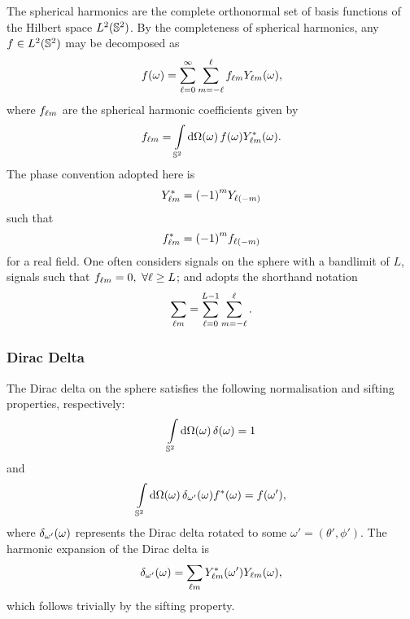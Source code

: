 The spherical harmonics are the complete orthonormal set of basis functions of the Hilbert space \(\hilbert{\twoSphere}\).
By the completeness of spherical harmonics, any \(f \in \hilbert{\twoSphere}\) may be decomposed as
%
\begin{equation}
	\pixel{f}
	= \sum\limits_{\ell=0}^{\infty} \sum\limits_{m=-\ell}^{\ell} \harmonic{f} \pixel{\harmonic{Y}},
\end{equation}
%
where \(\harmonic{f}\) are the spherical harmonic coefficients given by
%
\begin{equation}
	\harmonic{f}
	= \integrateSphere{\omega} \pixel{f} \pixel{\conj{\harmonic{Y}}}.
\end{equation}
%
The phase convention adopted here is
%
\begin{equation}
	\conj{\harmonic{Y}}
	= {(-1)}^{m} Y_{\ell(-m)}
\end{equation}
%
such that
%
\begin{equation}
	\conj{\harmonic{f}}
	= {(-1)}^{m} f_{\ell(-m)}
\end{equation}
%
for a real field.
One often considers signals on the sphere with a bandlimit of \(L\), \ie{} signals such that \(\harmonic{f} = 0,\ \forall \ell \geq L\); and adopts the shorthand notation
%
\begin{equation}
	\harmonicSum
	= \sum\limits_{\ell=0}^{L-1} \sum\limits_{m=-\ell}^{\ell}.
\end{equation}

\subsubsection{Dirac Delta}

The Dirac delta on the sphere satisfies the following normalisation and sifting properties, respectively:
%
\begin{equation}
	\integrateSphere{\omega} \pixel{\delta}
	= 1
\end{equation}
%
and
%
\begin{equation}
	\integrateSphere{\omega} \pixel{\delta_{\omega'}} \pixel{\conj{f}}
	= \pixel[']{f},
\end{equation}
%
where \(\pixel{\delta_{\omega'}}\) represents the Dirac delta rotated to some \(\omega'=(\theta',\phi')\).
The harmonic expansion of the Dirac delta is
%
\begin{equation}\label{eq:chapter2_dirac_omega}
	\pixel{\delta_{\omega'}}
	= \harmonicSum \pixel[']{\conj{\harmonic{Y}}} \pixel{\harmonic{Y}},
\end{equation}
%
which follows trivially by the sifting property.

